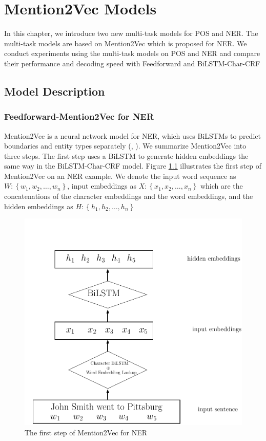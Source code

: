 \chapter{Mention2Vec Models}

In this chapter, we introduce two new multi-task models for POS and NER. The multi-task models are based on Mention2Vec which is proposed for NER. We conduct experiments using the multi-task models on POS and NER and compare their performance and decoding speed with Feedforward and BiLSTM-Char-CRF

\section{Model Description}

\subsection{Feedforward-Mention2Vec for NER}

Mention2Vec is a neural network model for NER, which uses BiLSTMs to predict boundaries and entity types separately (\citeauthor{stratos2016mention2vec}, \citeyear{stratos2016mention2vec}). We summarize Mention2Vec into three steps. The first step uses a BiLSTM to generate hidden embeddings the same way in the BiLSTM-Char-CRF model. Figure \ref{fig:mention2vec1} illustrates the first step of Mention2Vec on an NER example. We denote the input word sequence as $W: \left\{w_{1}, w_{2}, \dots, w_{n}\right\}$, input embeddings as $X: \left\{x_{1}, x_{2}, \dots, x_{n}\right\}$ which are the concatenations of the character embeddings and the word embeddings, and the hidden embeddings as $H: \left\{h_{1}, h_{2}, \dots, h_{n}\right\}$

\begin{figure}
  \centering
  \includegraphics[scale=0.6]{mention2vec1.pdf}
 \caption{The first step of Mention2Vec for NER}
  \label{fig:mention2vec1}
\end{figure}

